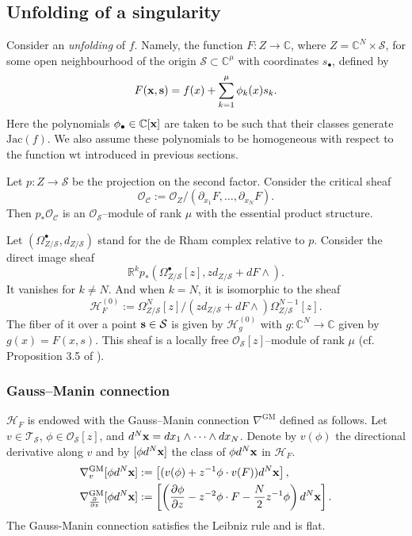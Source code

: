 \documentclass[12pt,a4paper]{amsart}
\newcommand{\CC}{{\mathbb{C}}}
\newcommand{\RR}{{\mathbb{R}}}
\newcommand{\calS}{{\cal S}}
\newcommand{\Jac}{\mathrm{Jac}}
\newcommand{\bx}{{\bf x}}
\newcommand{\wt}{\mathrm{wt}}
\def\C{{\mathcal C}}
\def\H{{\mathcal H}}
\def\O{{\mathcal O}}
\def\T{{\mathcal T}}
\renewcommand{\S}{{\mathcal S}}
\def\calS{{\mathcal S}}
\newcommand{\p}{{\partial}}
\newcommand{\<}{\left<}
\renewcommand{\>}{\right>}
\newcommand{\bs}{{\bf s}}
\newcommand{\GM}{{\mathrm{GM}}}
\numberwithin{equation}{section}
\begin{document}
\subsection{Unfolding of a singularity}

Consider an \textit{unfolding} of $f$. Namely, the function $F : Z \to \CC$, where $Z = \CC^N \times \calS$, for some open neighbourhood of the origin $\calS \subset \CC^\mu$ with coordinates $s_\bullet$, defined by
\[
    F(\bx,\bs) = f(x) + \sum_{k = 1}^\mu \phi_k(x) s_k.
\]
Here the polynomials $\phi_\bullet \in \CC[\bx]$ are taken to be such that their classes generate $\Jac(f)$. We also assume these polynomials to be homogeneous with respect to the function $\wt$ introduced in previous sections.

Let $p: Z \to \calS$ be the projection on the second factor. Consider the critical sheaf
\[
    \O_\C := \O_{Z} / \left( \p_{x_1}F, \dots, \p_{x_N} F \right).
\]
Then $p_\ast \O_\C$ is an $\O_\S$--module of rank $\mu$ with the essential product structure.

Let $(\Omega^\bullet_{Z/\calS},d_{Z/\calS})$ stand for the de Rham complex relative to $p$. Consider the direct image sheaf
\[
    \RR^k p_\ast \left( \Omega^\bullet_{Z/\calS} [z],z d_{Z/\calS} + dF \wedge \right).
\]
It vanishes for $k \neq N$. And when $k=N$, it is isomorphic to the sheaf
\[
    \H_F^{(0)} := \Omega^N_{Z/\calS} [z] / (z d_{Z/\calS} + dF \wedge ) \Omega^{N-1}_{Z/\calS} [z].
\]
The fiber of it over a point $\bs \in \calS$ is given by $\H^{(0)}_g$ with $g: \CC^N \to \CC$ given by $g(x) = F(x,s)$. This sheaf is a locally free $\O_\calS[z]$--module of rank $\mu$ (cf. Proposition 3.5 of \cite{IMRS}).

\subsubsection{Gauss--Manin connection}\label{section: Gauss-Manin connection}
$\H_F$ is endowed with the Gauss--Manin connection $\nabla^\GM$ defined as follows. Let $v \in \T_\calS$, $\phi \in \O_\calS[z]$, and $d^N\bx = dx_1\wedge \dots \wedge dx_N$. Denote by $v(\phi)$ the directional derivative along $v$ and by $[\phi d^N\bx]$ the class of $\phi d^N\bx$ in $\H_F$.
\begin{align}
    & \nabla_v^\GM [\phi d^N\bx] := \left[ (v (\phi) + z^{-1} \phi \cdot v(F)) d^N\bx \right],
    \\
    & \nabla_{\frac{\p}{\p z}}^\GM [\phi d^N\bx] := \left[ \left(\frac{\p \phi}{\p z} - z^{-2} \phi \cdot F - \frac{N}{2} z^{-1} \phi \right) d^N\bx \right].
\end{align}
The Gauss-Manin connection satisfies the Leibniz rule and is flat.
\end{document}
